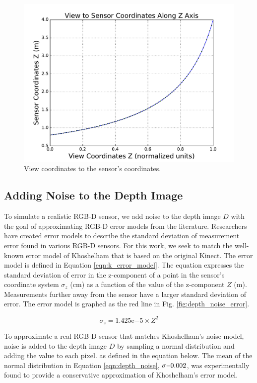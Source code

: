 \begin{figure}[h]%
\centering
  \includegraphics[width=.70\textwidth]
    {figures/expsetup_depth_view_to_sensor.pdf}
  \caption{View coordinates to the sensor's coordinates.}
  \label{fig:depth_view_to_sensor}
\end{figure}

\subsection{Adding Noise to the Depth Image}

To simulate a realistic RGB-D sensor, we add noise to the depth image $D$ with
the goal of approximating RGB-D error models from the literature. Researchers
have created error models to describe the standard deviation of measurement
error found in various RGB-D sensors. For this work, we seek to match the
well-known error model of Khoshelham \cite{Khoshelham2012} that is based on the
original Kinect. The error model is defined in Equation \ref{eqn:k_error_model}.
The equation expresses the standard deviation of error in the z-component of a
point in the sensor's coordinate system $\sigma_z$ (cm) as a function of the
value of the z-component $Z$ (m). Measurements further away from the sensor have
a larger standard deviation of error. The error model is graphed as the red line
in Fig. \ref{fig:depth_noise_error}.

\begin{equation}
  \sigma_z = 1.425\mathrm{e}{-5} \times Z^2
  \label{eqn:k_error_model}
\end{equation}

To approximate a real RGB-D sensor that matches Khoshelham's noise model, noise
is added to the depth image $D$ by sampling a normal distribution and adding the
value to each pixel. as defined in the equation below. The mean of the normal
distribution in Equation \ref{eqn:depth_noise}, $\sigma\mathsmaller{=}0.002$,
was experimentally found to provide a conservative approximation of Khoshelham's
error model.

